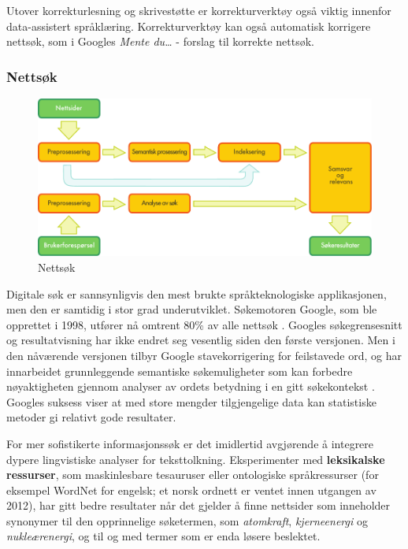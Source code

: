 \begin{multicols}{2}
Utover korrekturlesning og skrivestøtte er korrekturverktøy også viktig innenfor data-assistert språklæring. Korrekturverktøy kan også automatisk korrigere nettsøk, som i Googles \textit{Mente du…}  - forslag til korrekte nettsøk.

\subsubsection{Nettsøk}

\begin{figure}[htb]
  \center
  \includegraphics[width=\textwidth]{../_media/norwegian-bokmaal/web_search_architecture}
  \caption{Nettsøk}
  \label{fig:websearcharch_no}
 \end{figure}

Digitale søk er sannsynligvis den mest brukte språkteknologiske applikasjonen, men den er samtidig i stor grad underutviklet. Søkemotoren Google, som ble opprettet i 1998, utfører nå omtrent 80\% av alle nettsøk \cite{spi1}. 
Googles søkegrensesnitt og resultatvisning har ikke endret seg vesentlig siden den første versjonen. Men i den nåværende versjonen tilbyr Google stavekorrigering for feilstavede ord, og har innarbeidet grunnleggende semantiske søkemuligheter som kan forbedre nøyaktigheten gjennom analyser av ordets betydning i en gitt søkekontekst \cite{pc1}. Googles suksess viser at med store mengder tilgjengelige data kan statistiske metoder gi relativt gode resultater.

For mer sofistikerte informasjonssøk er det imidlertid avgjørende å integrere dypere lingvistiske analyser for teksttolkning. Eksperimenter med \textbf{leksikalske ressurser}, som maskinlesbare tesauruser eller ontologiske språkressurser (for eksempel WordNet for engelsk; et norsk ordnett er ventet innen utgangen av 2012), har gitt bedre resultater når det gjelder å finne nettsider som inneholder synonymer til den opprinnelige søketermen, som 
\textit{atomkraft}, \textit{kjerneenergi} og \textit{nukleærenergi}, og til og med termer som er enda løsere beslektet.  


\end{multicols}
